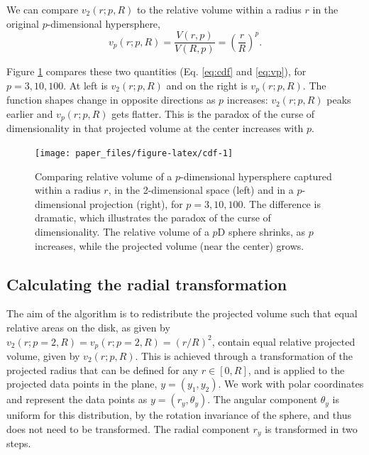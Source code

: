 \documentclass[]{interact}
\theoremstyle{plain}%
\theoremstyle{definition}
\theoremstyle{remark}
\begin{document}
We can compare \(v_{2} (r; p, R)\) to the relative volume within a
radius \(r\) in the original \(p\)-dimensional hypersphere,
\begin{equation}
v_{p} (r; p, R) = \frac{V(r, p)}{V(R, p)} = \left({\frac{r}{R}}\right)^p.
\label{eq:vp}
\end{equation}

Figure \ref{fig:cdf} compares these two quantities (Eq. \ref{eq:cdf} and
\ref{eq:vp}), for \(p=3, 10, 100\). At left is \(v_{2} (r; p, R)\) and
on the right is \(v_{p} (r; p, R)\). The function shapes change in
opposite directions as \(p\) increases: \(v_{2} (r; p, R)\) peaks
earlier and \(v_{p} (r; p, R)\) gets flatter. This is the paradox of the
curse of dimensionality in that projected volume at the center increases
with \(p\).

\begin{figure}

{\centering \texttt{[image: paper\_files/figure-latex/cdf-1]} 

}

\caption{Comparing relative volume of a $p$-dimensional hypersphere captured within a radius $r$, in the 2-dimensional space (left) and in a $p$-dimensional projection (right), for $p=3, 10, 100$. The difference is dramatic, which illustrates the paradox of the curse of dimensionality. The relative volume of a $p$D sphere shrinks, as $p$ increases, while the projected volume (near the center) grows.}\label{fig:cdf}
\end{figure}

\hypertarget{calculating-the-radial-transformation}{%
\subsection{Calculating the radial
transformation}\label{calculating-the-radial-transformation}}

The aim of the algorithm is to redistribute the projected volume such
that equal relative areas on the disk, as given by
\(v_{2} (r; p=2, R)= v_p(r; p=2, R) = (r/R)^2\), contain equal relative
projected volume, given by \(v_{2} (r; p, R)\). This is achieved through
a transformation of the projected radius that can be defined for any
\(r\in[0,R]\), and is applied to the projected data points in the plane,
\(y = (y_1, y_2)\). We work with polar coordinates and represent the
data points as \(y = (r_y, \theta_y)\). The angular component
\(\theta_y\) is uniform for this distribution, by the rotation
invariance of the sphere, and thus does not need to be transformed. The
radial component \(r_y\) is transformed in two steps.
\end{document}
